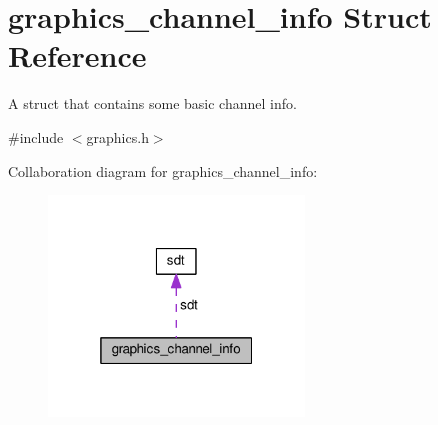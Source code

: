 \hypertarget{structgraphics__channel__info}{}\section{graphics\+\_\+channel\+\_\+info Struct Reference}
\label{structgraphics__channel__info}


A struct that contains some basic channel info.  




{\ttfamily \#include $<$graphics.\+h$>$}



Collaboration diagram for graphics\+\_\+channel\+\_\+info\+:\nopagebreak
\begin{figure}[H]
\begin{center}
\leavevmode
\includegraphics[width=193pt]{structgraphics__channel__info__coll__graph}
\end{center}
\end{figure}
